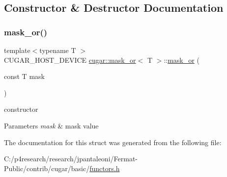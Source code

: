 \subsection{Constructor \& Destructor Documentation}
\mbox{\label{structcugar_1_1mask__or_a8c26498aac9e53fada9437c828f4ff20}} 
\subsubsection{\texorpdfstring{mask\+\_\+or()}{mask\_or()}}
{\footnotesize\ttfamily template$<$typename T $>$ \\
C\+U\+G\+A\+R\+\_\+\+H\+O\+S\+T\+\_\+\+D\+E\+V\+I\+CE \hyperlink{structcugar_1_1mask__or}{cugar\+::mask\+\_\+or}$<$ T $>$\+::\hyperlink{structcugar_1_1mask__or}{mask\+\_\+or} (\begin{DoxyParamCaption}\item[{const T}]{mask }\end{DoxyParamCaption})\hspace{0.3cm}{\ttfamily [inline]}}

constructor


\begin{DoxyParams}{Parameters}
{\em mask} & mask value \\
\hline
\end{DoxyParams}


The documentation for this struct was generated from the following file\+:\begin{DoxyCompactItemize}
\item 
C\+:/p4research/research/jpantaleoni/\+Fermat-\/\+Public/contrib/cugar/basic/\hyperlink{functors_8h}{functors.\+h}\end{DoxyCompactItemize}
